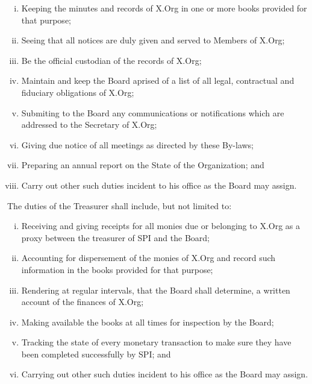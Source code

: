 \documentclass[10pt, english]{xorgdocs}
\begin{document}
\begin{enumerate}[(i)\hspace{.2cm}]
	\item Keeping the minutes and records of X.Org in one or more books
	provided for that purpose;

	\item Seeing that all notices are duly given and served to Members of
	X.Org;

	\item Be the official custodian of the records of X.Org;

	\item Maintain and keep the Board aprised of a list of all legal,
	contractual and fiduciary obligations of X.Org;

	\item Submiting to the Board any communications or notifications which
	are addressed to the Secretary of X.Org;

	\item Giving due notice of all meetings as directed by these By-laws;

	\item Preparing an annual report on the State of the Organization; and

	\item Carry out other such duties incident to his office as the Board
	may assign.
\end{enumerate}

The duties of the Treasurer shall include, but not limited to:

\begin{enumerate}[(i)\hspace{.2cm}]
	\item Receiving and giving receipts for all monies due or belonging to
	X.Org as a proxy between the treasurer of SPI and the Board;

	\item Accounting for dispersement of the monies of X.Org and record such
	information in the books provided for that purpose;

	\item Rendering at regular intervals, that the Board shall determine, a
	written account of the finances of X.Org;

	\item Making available the books at all times for inspection by the
	Board;

	\item Tracking the state of every monetary transaction to make sure
	they have been completed successfully by SPI; and

	\item Carrying out other such duties incident to his office as the
	Board may assign.
\end{enumerate}
\end{document}
